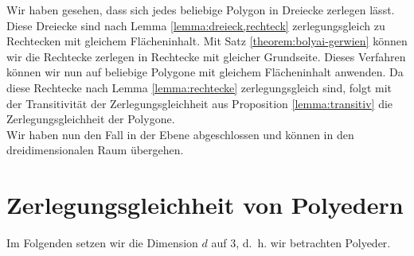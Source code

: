 \documentclass[11pt,titlepage]{article}
\theoremstyle{definition}
\theoremstyle{remark}
\begin{document}
	Wir haben gesehen, dass sich jedes beliebige Polygon in Dreiecke zerlegen lässt. Diese Dreiecke 
	sind nach Lemma \ref{lemma:dreieck,rechteck} zerlegungsgleich zu Rechtecken mit gleichem 
	Flächeninhalt. Mit Satz \ref{theorem:bolyai-gerwien} können wir die Rechtecke zerlegen in Rechtecke 
	mit gleicher Grundseite. Dieses Verfahren können wir nun auf beliebige Polygone mit gleichem Flächeninhalt 
	anwenden. Da diese Rechtecke nach Lemma \ref{lemma:rechtecke} zerlegungsgleich sind, folgt mit der 
	Transitivität der Zerlegungsgleichheit aus Proposition \ref{lemma:transitiv} die Zerlegungsgleichheit der Polygone. \\
	Wir haben nun den Fall in der Ebene abgeschlossen und können in 
	den dreidimensionalen Raum übergehen. 
	
	\newpage
	
	\section{Zerlegungsgleichheit von Polyedern}
	
	Im Folgenden setzen wir die Dimension $d$ auf $3$, d.~h. wir betrachten Polyeder. 
	
\end{document}
